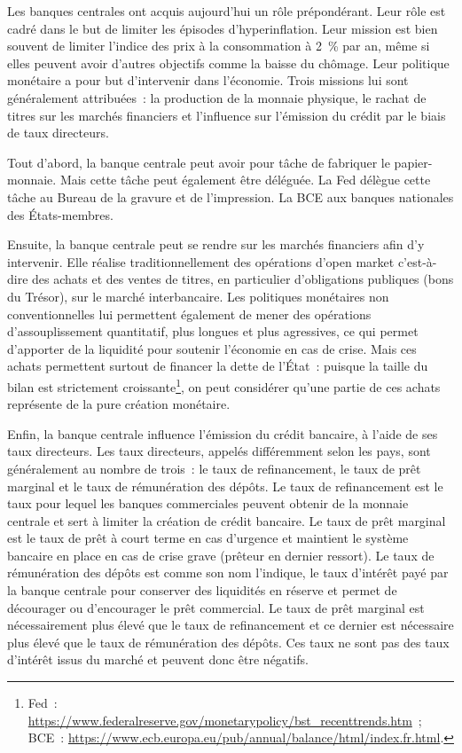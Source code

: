 
Les banques centrales ont acquis aujourd'hui un rôle prépondérant. Leur rôle est cadré dans le but de limiter les épisodes d'hyperinflation. Leur mission est bien souvent de limiter l'indice des prix à la consommation à 2~\% par an, même si elles peuvent avoir d'autres objectifs comme la baisse du chômage. Leur politique monétaire a pour but d'intervenir dans l'économie. Trois missions lui sont généralement attribuées~: la production de la monnaie physique, le rachat de titres sur les marchés financiers et l'influence sur l'émission du crédit par le biais de taux directeurs.

Tout d'abord, la banque centrale peut avoir pour tâche de fabriquer le papier-monnaie. Mais cette tâche peut également être déléguée. La Fed délègue cette tâche au Bureau de la gravure et de l'impression. La BCE aux banques nationales des États-membres.

Ensuite, la banque centrale peut se rendre sur les marchés financiers afin d'y intervenir. Elle réalise traditionnellement des opérations d'open market c'est-à-dire des achats et des ventes de titres, en particulier d'obligations publiques (bons du Trésor), sur le marché interbancaire. Les politiques monétaires non conventionnelles lui permettent également de mener des opérations d'assouplissement quantitatif, plus longues et plus agressives, ce qui permet d'apporter de la liquidité pour soutenir l'économie en cas de crise. Mais ces achats permettent surtout de financer la dette de l'État~: puisque la taille du bilan est strictement croissante\footnote{Fed~: \url{https://www.federalreserve.gov/monetarypolicy/bst_recenttrends.htm}~; BCE~: \url{https://www.ecb.europa.eu/pub/annual/balance/html/index.fr.html}.}, on peut considérer qu'une partie de ces achats représente de la pure création monétaire.

Enfin, la banque centrale influence l'émission du crédit bancaire, à l'aide de ses taux directeurs. Les taux directeurs, appelés différemment selon les pays, sont généralement au nombre de trois~: le taux de refinancement, le taux de prêt marginal et le taux de rémunération des dépôts. Le taux de refinancement est le taux pour lequel les banques commerciales peuvent obtenir de la monnaie centrale et sert à limiter la création de crédit bancaire. Le taux de prêt marginal est le taux de prêt à court terme en cas d'urgence et maintient le système bancaire en place en cas de crise grave (prêteur en dernier ressort). Le taux de rémunération des dépôts est comme son nom l'indique, le taux d'intérêt payé par la banque centrale pour conserver des liquidités en réserve et permet de décourager ou d'encourager le prêt commercial. Le taux de prêt marginal est nécessairement plus élevé que le taux de refinancement et ce dernier est nécessaire plus élevé que le taux de rémunération des dépôts. Ces taux ne sont pas des taux d'intérêt issus du marché et peuvent donc être négatifs.

